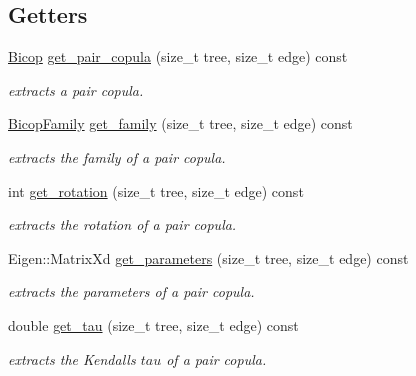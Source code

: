 \subsection*{Getters}
\begin{DoxyCompactItemize}
\item 
\hyperlink{classvinecopulib_1_1_bicop}{Bicop} \hyperlink{classvinecopulib_1_1_vinecop_a5a75b825ad6091d734dc163c3277b36b}{get\+\_\+pair\+\_\+copula} (size\+\_\+t tree, size\+\_\+t edge) const
\begin{DoxyCompactList}\small\item\em extracts a pair copula. \end{DoxyCompactList}\item 
\hyperlink{namespacevinecopulib_a42e95cc06d33896199caab0c11ad44f3}{Bicop\+Family} \hyperlink{classvinecopulib_1_1_vinecop_a5c909eae77a38558d46d6d4b98564e57}{get\+\_\+family} (size\+\_\+t tree, size\+\_\+t edge) const
\begin{DoxyCompactList}\small\item\em extracts the family of a pair copula. \end{DoxyCompactList}\item 
int \hyperlink{classvinecopulib_1_1_vinecop_a889a0c1c5c143e32cf34aa9bd15e33b6}{get\+\_\+rotation} (size\+\_\+t tree, size\+\_\+t edge) const
\begin{DoxyCompactList}\small\item\em extracts the rotation of a pair copula. \end{DoxyCompactList}\item 
Eigen\+::\+Matrix\+Xd \hyperlink{classvinecopulib_1_1_vinecop_a16872eaecac2cf3f90c7f282c453fe58}{get\+\_\+parameters} (size\+\_\+t tree, size\+\_\+t edge) const
\begin{DoxyCompactList}\small\item\em extracts the parameters of a pair copula. \end{DoxyCompactList}\item 
double \hyperlink{classvinecopulib_1_1_vinecop_a3f4cc62395a9ae4ce2b7714ceae6bde3}{get\+\_\+tau} (size\+\_\+t tree, size\+\_\+t edge) const
\begin{DoxyCompactList}\small\item\em extracts the Kendall\textquotesingle{}s $ tau $ of a pair copula. \end{DoxyCompactList}\item 
\mbox{\label{classvinecopulib_1_1_vinecop_a508971cf99ce5a94712168d10b736812}} 

\end{DoxyCompactItemize}
